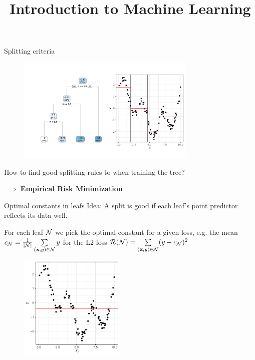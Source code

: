 \documentclass[11pt,compress,t,notes=noshow, xcolor=table]{beamer}
\title{Introduction to Machine Learning}
\institute{\href{https://compstat-lmu.github.io/lecture_i2ml/}{compstat-lmu.github.io/lecture\_i2ml}}
\date{}
\begin{document}
\sloppy


\begin{frame}{Splitting criteria}

 \begin{figure}
    \centering
      \includegraphics[height = 5.0cm, keepaspectratio]{figure/tree-regr-depth3.pdf}
    \end{figure}

How to find good splitting rules to when training the tree?
\lz

$\implies$ \textbf{Empirical Risk Minimization}

\end{frame}

\begin{vbframe}{Optimal constants in leafs}
Idea: A split is good if each leaf's point predictor reflects its data well. 
\vspace{0.2cm}

For each leaf $\mathcal{N}$ we pick the optimal constant for a given loss, e.g. the mean $c_{\mathcal{N}} = \frac{1}{|\mathcal{N}|}\sum\limits_{(\mathbf{x}, y) \in \mathcal{N}} y$ for the L2 loss $\mathcal{R}(\mathcal{N}) = \sum\limits_{(\mathbf{x}, y) \in \mathcal{N}} (y - c_{\mathcal{N}})^2$

\begin{figure}
\includegraphics[width=0.45\textwidth]{figure/splitcrit_optimal-constant.pdf} 
\end{figure}



\end{vbframe}
\end{document}
